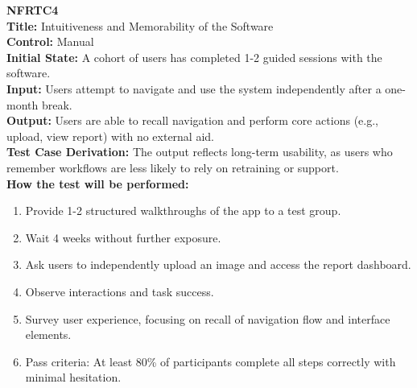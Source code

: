 \documentclass[12pt, titlepage]{article}
\begin{document}
\textbf{NFRTC4}\\
\textbf{Title:} Intuitiveness and Memorability of the Software\\
\textbf{Control:} Manual\\
\textbf{Initial State:} A cohort of users has completed 1-2 guided sessions with the software.\\
\textbf{Input:} Users attempt to navigate and use the system independently after a one-month break.\\
\textbf{Output:} Users are able to recall navigation and perform core actions (e.g., upload, view report) with no external aid.\\
\textbf{Test Case Derivation:} The output reflects long-term usability, as users who remember workflows are less likely to rely on retraining or support.\\
\textbf{How the test will be performed:}
\begin{enumerate}
  \item Provide 1-2 structured walkthroughs of the app to a test group.
  \item Wait 4 weeks without further exposure.
  \item Ask users to independently upload an image and access the report dashboard.
  \item Observe interactions and task success.
  \item Survey user experience, focusing on recall of navigation flow and interface elements.
  \item Pass criteria: At least 80\% of participants complete all steps correctly with minimal hesitation.
\end{enumerate}

\vspace{1em}
\end{document}
